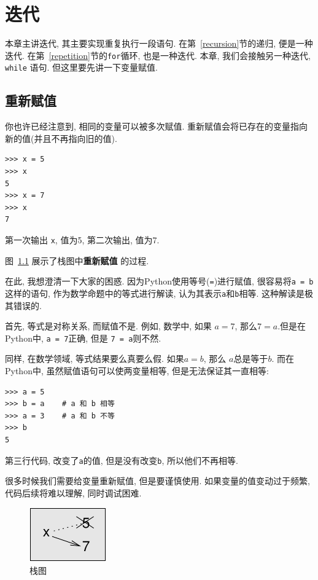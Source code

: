 \documentclass[10pt]{book}
\begin{document}
\chapter{迭代}

本章主讲迭代, 其主要实现重复执行一段语句. 
在第~\ref{recursion}节的递归, 便是一种迭代. 
在第~\ref{repetition}节的{\tt for}循环, 也是一种迭代. 
本章, 我们会接触另一种迭代, {\tt while} 语句. 
但这里要先讲一下变量赋值. 

\section{重新赋值}

你也许已经注意到, 相同的变量可以被多次赋值. 
重新赋值会将已存在的变量指向新的值(并且不再指向旧的值).

\begin{verbatim}
>>> x = 5
>>> x
5
>>> x = 7
>>> x
7
\end{verbatim}
%
第一次输出{ \tt x}, 值为5, 第二次输出, 值为7.

图~\ref{fig.assign2}  展示了栈图中{\bf 重新赋值}
的过程.  

在此, 我想澄清一下大家的困惑.
因为Python使用等号({\tt =})进行赋值, 
很容易将{\tt a = b}这样的语句, 作为数学命题中的等式进行解读, 
认为其表示{\tt a}和{\tt b}相等. 
这种解读是极其错误的. 

首先, 等式是对称关系, 而赋值不是. 
例如, 数学中, 如果 $a=7$, 那么$7=a$.但是在Python中, 
{\tt a = 7}正确, 但是 {\tt 7 = a}则不然. 

同样, 在数学领域, 等式结果要么真要么假. 
如果$a=b$, 那么 $a$总是等于$b$. 
而在Python中, 虽然赋值语句可以使两变量相等, 但是无法保证其一直相等:

\begin{verbatim}
>>> a = 5
>>> b = a    # a 和 b 相等
>>> a = 3    # a 和 b 不等
>>> b
5
\end{verbatim}
%
第三行代码, 改变了{\tt a}的值, 但是没有改变{\tt b}, 所以他们不再相等. 

很多时候我们需要给变量重新赋值, 但是要谨慎使用. 
如果变量的值变动过于频繁, 代码后续将难以理解, 同时调试困难. 

\begin{figure}
\centerline
{\includegraphics[scale=0.8]{figs/assign2.pdf}}
\caption{栈图}
\label{fig.assign2}
\end{figure}
\end{document}
